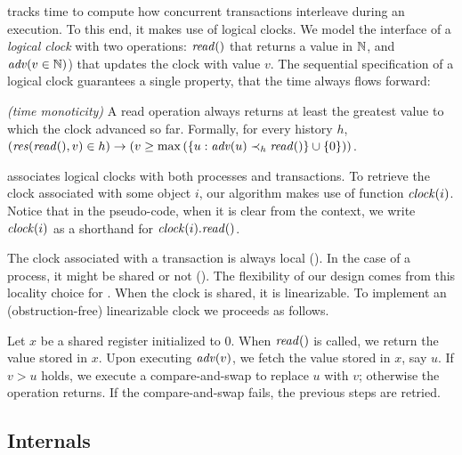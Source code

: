 
 tracks time to compute how concurrent transactions interleave during an execution.
To this end, it makes use of logical clocks.
We model the interface of a \emph{logical clock} with two operations:
$\cread$ that returns a value in $\naturalSet$, 
and $\cadv(v \in \naturalSet)$) that updates the clock with value $v$.
The sequential specification of a logical clock guarantees a single property, that the time always flows forward:
\begin{inparaenum}
\item[\emph{(time monoticity)}]
  A read operation always returns at least the greatest value to which the clock advanced so far.
  Formally, for every history $h$, $(\responseAny{\cread}{v} \in h) \implies (v \geq \max{(\{u : \cadv(u) \hb_h \cread \} \union \{0\})})$.
\end{inparaenum}

 associates logical clocks with both processes and transactions.
To retrieve the clock associated with some object $i$, our algorithm makes use of function $\clockOf{i}$.
Notice that in the pseudo-code, when it is clear from the context, 
we write $\clockOf{i}$ as a shorthand for $\clockOf{i}.\mathit{read}()$.

The clock associated with a transaction is always local ().
In the case of a process, it might be shared or not ().
The flexibility of our design comes from this locality choice for .
When the clock is shared, it is linearizable.
To implement an (obstruction-free) linearizable clock we proceeds as follows.
\begin{construction}
  Let $x$ be a shared register initialized to $0$.
  When $\cread$ is called, we return the value stored in $x$.
  Upon executing $\cadv(v)$, we fetch the value stored in $x$, say $u$.
  If $v > u$ holds, we execute a compare-and-swap to replace $u$ with $v$; 
  otherwise the operation returns.
  If the compare-and-swap fails, the previous steps are retried.
\end{construction}



\subsection{Internals}

